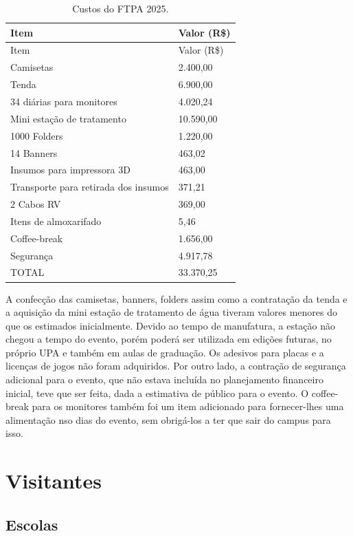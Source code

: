 \documentclass[
  letterpaper,
  DIV=11,
  numbers=noendperiod]{scrreprt}
\begin{document}
\begin{longtable}[]{@{}ll@{}}
\caption{Custos do FTPA 2025.}\tabularnewline
\toprule\noalign{}
Item & Valor (R\$) \\
\midrule\noalign{}
\endfirsthead
\toprule\noalign{}
Item & Valor (R\$) \\
\midrule\noalign{}
\endhead
\bottomrule\noalign{}
\endlastfoot
50 Camisetas & 2.400,00 \\
Tenda & 6.900,00 \\
34 diárias para monitores & 4.020,24 \\
Mini estação de tratamento & 10.590,00 \\
1000 Folders & 1.220,00 \\
14 Banners & 463,02 \\
Insumos para impressora 3D & 463,00 \\
Transporte para retirada dos insumos & 371,21 \\
2 Cabos RV & 369,00 \\
Itens de almoxarifado & 5,46 \\
Coffee-break & 1.656,00 \\
Segurança & 4.917,78 \\
TOTAL & 33.370,25 \\
\end{longtable}

A confecção das camisetas, banners, folders assim como a contratação da
tenda e a aquisição da mini estação de tratamento de água tiveram
valores menores do que os estimados inicialmente. Devido ao tempo de
manufatura, a estação não chegou a tempo do evento, porém poderá ser
utilizada em edições futuras, no próprio UPA e também em aulas de
graduação. Os adesivos para placas e a licenças de jogos não foram
adquiridos. Por outro lado, a contração de segurança adicional para o
evento, que não estava incluída no planejamento financeiro inicial, teve
que ser feita, dada a estimativa de público para o evento. O
coffee-break para os monitores também foi um item adicionado para
fornecer-lhes uma alimentação nso dias do evento, sem obrigá-los a ter
que sair do campus para isso.


\chapter{Visitantes}\label{visitantes}

\section{Escolas}\label{escolas-1}
\end{document}
